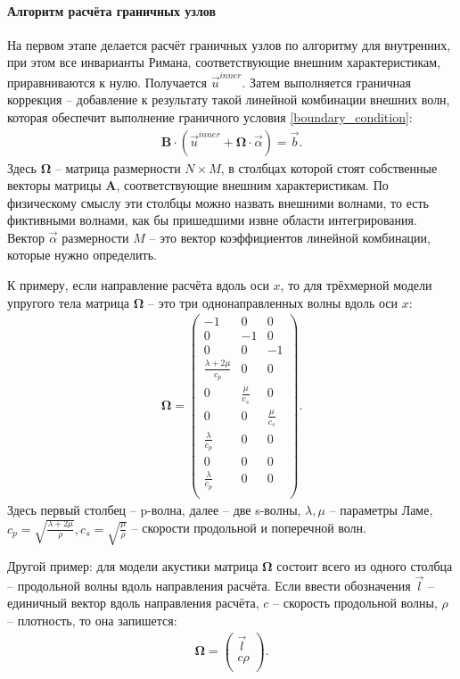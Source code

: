 \paragraph{Алгоритм расчёта граничных узлов}
\label{sec:good-border-case}
На первом этапе делается расчёт граничных узлов по алгоритму для внутренних, 
при этом все инварианты Римана, соответствующие внешним характеристикам, приравниваются к нулю. 
Получается $\vec{u}^{inner}$. Затем выполняется граничная коррекция -- 
добавление к результату такой линейной комбинации внешних волн, 
которая обеспечит выполнение граничного условия \eqref{boundary_condition}:
\begin{eqnarray}
	\mathbf{B} \cdot (\vec{u}^{inner} + \mathbf{\Omega} \cdot \vec{\alpha}) = \vec{b}.
\end{eqnarray}
Здесь $\mathbf{\Omega}$ -- матрица размерности $N \times M$, 
в столбцах которой стоят собственные векторы 
матрицы $\mathbf{A}$, соответствующие внешним характеристикам.
По физическому смыслу эти столбцы можно назвать внешними волнами,
то есть фиктивными волнами, как бы пришедшими извне области интегрирования.
Вектор $\vec{\alpha}$ размерности $M$ -- это вектор
коэффициентов линейной комбинации, которые нужно определить.

К примеру, если направление расчёта вдоль оси $x$, то 
для трёхмерной модели упругого тела матрица $\mathbf{\Omega}$ -- 
это три однонаправленных волны вдоль оси $x$:
\begin{align}
\label{Omega_for_elastic3D}
	\mathbf{\Omega} =
	\left( \begin{array}{cccccccccccc}
	-1 & 0  &  0 \\
	 0 & -1 &  0 \\
	 0 &  0 & -1 \\
	\frac{\lambda+2\mu}{c_p} & 0 & 0 \\
	0 & \frac{\mu}{c_s} & 0 \\
	0 & 0 & \frac{\mu}{c_s} \\
	\frac{\lambda}{c_p} & 0 & 0 \\
	0 & 0 & 0 \\
	\frac{\lambda}{c_p} & 0 & 0 \\
	\end{array} \right).
\end{align} 
Здесь первый столбец -- p-волна, далее -- две s-волны, 
$\lambda, \mu$ -- параметры Ламе, 
$c_p = \sqrt{\frac{\lambda + 2\mu}{\rho}}, c_s = \sqrt{\frac{\mu}{\rho}}$ -- 
скорости продольной и поперечной волн.

Другой пример: для модели акустики матрица $\mathbf{\Omega}$ состоит 
всего из одного столбца -- продольной волны вдоль направления расчёта. 
Если ввести обозначения $\vec{l}$ -- единичный вектор вдоль направления расчёта,
$c$ -- скорость продольной волны, $\rho$ -- плотность, то она запишется:
\begin{align}
\label{Omega_for_acoustic}
	\mathbf{\Omega} =
	\left( \begin{array}{cccccccccccc}
	 \vec{l} \\
	 c \rho \\
	\end{array} \right).
\end{align} 

